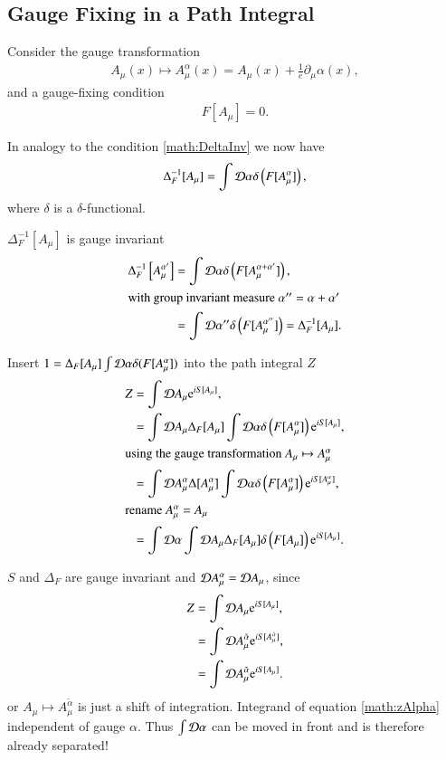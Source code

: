 \subsection{Gauge Fixing in a Path Integral}
Consider the gauge transformation 
\begin{align}
   A_\mu(x) \mapsto A_\mu^\alpha(x) = A_\mu(x) + \frac{1}{e} \partial_\mu \alpha(x),
\end{align}
and a gauge-fixing condition 
\begin{align}
   F[A_\mu] = 0.
\end{align}

In analogy to the condition \ref{math:DeltaInv} we now have
\begin{align}
   \Delta_F^{-1}[A_\mu] = \int \mathcal{D} \alpha \delta \left(F[A_\mu^\alpha] \right),
\end{align}
where $\delta$ is a $\delta$-functional.

$\Delta_F^{-1}[A_\mu]$ is gauge invariant
\begin{align*}
   \Delta_F^{-1} \left[ A_\mu^{\alpha'} \right] &= \int \mathcal{D} \alpha \delta \left( F [A_\mu^{\alpha+\alpha'}] \right), \\
   \shortintertext{with group invariant measure $\alpha'' = \alpha + \alpha'$}
                        &= \int \mathcal{D} \alpha''  \delta \left( F[A_\mu^{\alpha''}] \right) = \Delta_F^{-1}[A_\mu].
\end{align*}

Insert $1 = \Delta_F [A_\mu] \int \mathcal{D} \alpha \delta(F[A_\mu^\alpha])$ into the path integral $Z$
\begin{align}
   Z &= \int \mathcal{D} A_\mu \mathrm{e}^{iS[A_\mu]}, \notag\\
     &= \int \mathcal{D} A_\mu \Delta_F[A_\mu] \int \mathcal{D} \alpha \delta \left( F[A_\mu^\alpha] \right) \mathrm{e}^{iS[A_\mu]}, \notag\\
   \shortintertext{using the gauge transformation $A_\mu \mapsto A_\mu^\alpha$}
     &= \int \mathcal{D} A_\mu^\alpha \Delta [A_\mu^\alpha] \int \mathcal{D} \alpha \delta \left( F[A_\mu^\alpha] \right)\mathrm{e}^{iS[A^\alpha_\mu]}, \notag \\
     \shortintertext{rename $A^\alpha_\mu = A_\mu$}
     &= \int \mathcal{D} \alpha \int \mathcal{D} A_\mu  \Delta_F [A_\mu] \delta \left( F[A_\mu] \right) \mathrm{e}^{iS[A_\mu]}. \label{math:zAlpha}
\end{align}

$S$ and $\Delta_F$ are gauge invariant and $\mathcal{D} A_\mu^\alpha = \mathcal{D} A_\mu$, since
\begin{align*}
   Z &= \int \mathcal{D} A_\mu \mathrm{e}^{iS[A_\mu]}, \\
     &= \int \mathcal{D} A_\mu^{\tilde{\alpha}} \mathrm{e}^{iS[A_\mu^{\tilde{\alpha}}]}, \\
     &= \int \mathcal{D} A_\mu^{\tilde{\alpha}} \mathrm{e}^{iS[A_\mu]}.
\end{align*}
or $A_\mu \mapsto A_\mu^{\tilde{\alpha}}$ is just a shift of integration. Integrand of equation \ref{math:zAlpha} independent of gauge $\alpha$. Thus $\int \mathcal{D} \alpha$ can be moved in front and is therefore already separated!

